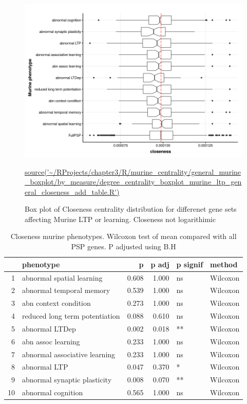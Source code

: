 \begin{figure}
    \centering
    \includegraphics[width=\textwidth]{images/chapter3/ggplot2/murine_centrality_boxplot/add_theme/addLTP/Rplot_closeness_editnolog10.png}
    \caption{Box plot of Closeness centrality distribution for differenet gene sets affecting Murine LTP or learning. Closeness not logarithimic} 
   \tiny\url{source('~/RProjects/chapter3/R/murine_centrality/general_murine_boxplot/by_measure/degree_centrality_boxplot_murine_ltp_general_closeness_add_table.R')}
    \label{fig:murine_ltp_centrality_boxplot_closeness}
\end{figure}

\begin{table}[ht]
\centering
\begin{tabular}{rlrrll}
  \toprule
 & phenotype & p & p adj & p signif & method \\ 
  \midrule
1 & abnormal spatial learning & 0.608 & 1.000 & ns & Wilcoxon \\ 
  2 & abnormal temporal memory & 0.539 & 1.000 & ns & Wilcoxon \\ 
  3 & abn context condition & 0.273 & 1.000 & ns & Wilcoxon \\ 
  4 & reduced long term potentiation & 0.088 & 0.610 & ns & Wilcoxon \\ 
  5 & abnormal LTDep & 0.002 & 0.018 & ** & Wilcoxon \\ 
  6 & abn assoc learning & 0.233 & 1.000 & ns & Wilcoxon \\ 
  7 & abnormal associative learning & 0.233 & 1.000 & ns & Wilcoxon \\ 
  8 & abnormal LTP & 0.047 & 0.370 & * & Wilcoxon \\ 
  9 & abnormal synaptic plasticity & 0.008 & 0.070 & ** & Wilcoxon \\ 
  10 & abnormal cognition & 0.565 & 1.000 & ns & Wilcoxon \\ 
   \bottomrule
\end{tabular}
\caption{Closeness murine phenotypes. Wilcoxon test of mean compared with all PSP genes. P adjusted using B.H} 
\label{tab:closeness murine phenotypes. Wilcoxon test compared with full PSP.}
\end{table}

